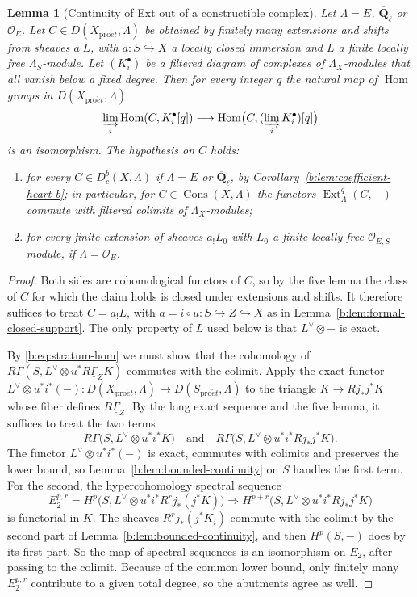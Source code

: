 \documentclass[11pt,a4paper]{article}
\numberwithin{equation}{section}
\newtheorem{lemma}[theorem]{Lemma}
\theoremstyle{definition}
\theoremstyle{remark}
\newcommand{\D}{D}
\newcommand{\Dbc}{D^b_c}
\newcommand{\Qbar}{\overline{\mathbf Q}_\ell}
\newcommand{\proet}{\mathrm{pro}\acute{e}t}
\newcommand{\Hom}{\operatorname{Hom}}
\newcommand{\Ext}{\operatorname{Ext}}
\newcommand{\Cons}{\operatorname{Cons}}
\begin{document}
\begin{lemma}[Continuity of Ext out of a constructible complex]
\label{b:lem:constructible-ext-continuity}\label{b:lem:constructible-ext-continuity-b}
Let $\Lambda=E$, $\Qbar$ or $\mathcal O_E$. Let $C\in\D(X_{\proet},\Lambda)$
be obtained by finitely many extensions and shifts from sheaves $a_!L$,
with $a:S\hookrightarrow X$ a locally closed immersion and $L$ a finite
locally free $\Lambda_S$-module. Let $(K_i^\bullet)$ be a filtered diagram
of complexes of $\Lambda_X$-modules that all vanish below a fixed degree.
Then for every integer $q$ the natural map of $\Hom$ groups in
$\D(X_{\proet},\Lambda)$
\[
 \varinjlim_i\Hom(C,K_i^\bullet[q])
 \longrightarrow
 \Hom\bigl(C,(\varinjlim_i K_i^\bullet)[q]\bigr)
\]
is an isomorphism. The hypothesis on $C$ holds:
\begin{enumerate}
\item for every $C\in\Dbc(X,\Lambda)$ if $\Lambda=E$ or $\Qbar$, by
  Corollary~\ref{b:lem:coefficient-heart-b}; in particular, for
  $C\in\Cons(X,\Lambda)$ the functors $\Ext^q_\Lambda(C,-)$ commute with
  filtered colimits of $\Lambda_X$-modules;
\item for every finite extension of sheaves $a_!L_0$ with $L_0$ a finite
  locally free $\mathcal O_{E,S}$-module, if $\Lambda=\mathcal O_E$.
\end{enumerate}
\end{lemma}
\begin{proof}
Both sides are cohomological functors of $C$, so by the five lemma the
class of $C$ for which the claim holds is closed under extensions and
shifts. It therefore suffices to treat $C=a_!L$, with $a=i\circ
u:S\hookrightarrow Z\hookrightarrow X$ as in
Lemma~\ref{b:lem:formal-closed-support}. The only property of $L$ used
below is that $L^\vee\otimes-$ is exact.

By \eqref{b:eq:stratum-hom} we must show that the cohomology of
$R\Gamma(S,L^\vee\otimes u^*R\underline\Gamma_ZK)$ commutes with the
colimit. Apply the exact functor
$L^\vee\otimes u^*i^*(-)\colon\D(X_{\proet},\Lambda)\to\D(S_{\proet},\Lambda)$
to the triangle $K\to Rj_*j^*K$ whose fiber defines $R\underline\Gamma_Z$. By the
long exact sequence and the five lemma, it suffices to treat the two
terms
\[
 R\Gamma\bigl(S,L^\vee\otimes u^*i^*K\bigr)
 \quad\text{and}\quad
 R\Gamma\bigl(S,L^\vee\otimes u^*i^*Rj_*j^*K\bigr).
\]
The functor $L^\vee\otimes u^*i^*(-)$ is exact, commutes with colimits and
preserves the lower bound, so Lemma~\ref{b:lem:bounded-continuity} on $S$
handles the first term. For the second, the hypercohomology spectral
sequence
\[
 E_2^{p,r}=H^p\bigl(S,L^\vee\otimes u^*i^*R^rj_*(j^*K)\bigr)
 \Longrightarrow
 H^{p+r}\bigl(S,L^\vee\otimes u^*i^*Rj_*j^*K\bigr)
\]
is functorial in $K$. The sheaves $R^rj_*(j^*K_i)$ commute with the
colimit by the second part of Lemma~\ref{b:lem:bounded-continuity}, and
then $H^p(S,-)$ does by its first part. So the map of spectral sequences
is an isomorphism on $E_2$, after passing to the colimit. Because of the
common lower bound, only finitely many $E_2^{p,r}$ contribute to a given
total degree, so the abutments agree as well.
\end{proof}
\end{document}
